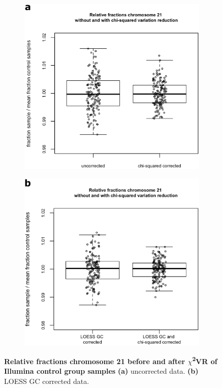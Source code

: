\begin{figure}[h]
	\begin{subfigure}{.5\textwidth}
		\centering
		\includegraphics[width=1\linewidth]{img/NIPT_Supp1_Fig1_6a}
		\label{fig:NIPT_Supp1_Fig1_6a}
	\end{subfigure}%
	\begin{subfigure}{.5\textwidth}
		\centering
		\includegraphics[width=1\linewidth]{img/NIPT_Supp1_Fig1_6b}
		\label{fig:NIPT_Supp1_Fig1_6b}
	\end{subfigure} 
	\caption[Relative fractions chromosome 21 before and after $\chi$\textsuperscript{2}VR]{\textbf{Relative fractions chromosome 21 before and after $\chi$\textsuperscript{2}VR of Illumina control group samples} \textbf{(a)} uncorrected data. \textbf{(b)} LOESS GC corrected data.}
	\label{fig:NIPT_Supp1_Fig1_6}
\end{figure}

